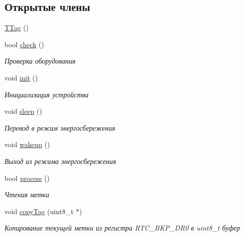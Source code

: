 \subsection*{Открытые члены}
\begin{DoxyCompactItemize}
\item 
\hyperlink{classunit_1_1_t_tag_afc2c7b675721b1577270b70a5dc02649}{T\+Tag} ()
\item 
\mbox{\label{classunit_1_1_t_tag_adc2c2801738b094045529f1373f28203}} 
bool \hyperlink{classunit_1_1_t_tag_adc2c2801738b094045529f1373f28203}{check} ()
\begin{DoxyCompactList}\small\item\em Проверка оборудования \end{DoxyCompactList}\item 
\mbox{\label{classunit_1_1_t_tag_ae3158aefc30472351d25cfba3c3f0b9f}} 
void \hyperlink{classunit_1_1_t_tag_ae3158aefc30472351d25cfba3c3f0b9f}{init} ()
\begin{DoxyCompactList}\small\item\em Инициализация устройства \end{DoxyCompactList}\item 
\mbox{\label{classunit_1_1_t_tag_acd600380312d44954f0b46ec5f704691}} 
void \hyperlink{classunit_1_1_t_tag_acd600380312d44954f0b46ec5f704691}{sleep} ()
\begin{DoxyCompactList}\small\item\em Перевод в режим энергосбережения \end{DoxyCompactList}\item 
\mbox{\label{classunit_1_1_t_tag_afc0b9080d0c67ed9fbdaa4ae3bfdfc7c}} 
void \hyperlink{classunit_1_1_t_tag_afc0b9080d0c67ed9fbdaa4ae3bfdfc7c}{wakeup} ()
\begin{DoxyCompactList}\small\item\em Выход из режима энергосбережения \end{DoxyCompactList}\item 
bool \hyperlink{classunit_1_1_t_tag_a1dfd588909730d0b48edbeda273526fe}{process} ()
\begin{DoxyCompactList}\small\item\em Чтения метки \end{DoxyCompactList}\item 
void \hyperlink{classunit_1_1_t_tag_a90fba846800afa1b828d81f079ba735e}{copy\+Tag} (uint8\+\_\+t $\ast$)
\begin{DoxyCompactList}\small\item\em Копирование текущей метки из регистра R\+T\+C\+\_\+\+B\+K\+P\+\_\+\+D\+R0 в uint8\+\_\+t буфер \end{DoxyCompactList}\end{DoxyCompactItemize}


